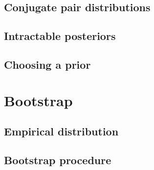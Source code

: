 \documentclass[../Year1.tex]{subfiles}
\begin{document}
\subsection{Conjugate pair distributions}
\subsection{Intractable posteriors}
\subsection{Choosing a prior}
\section{Bootstrap}
\subsection{Empirical distribution}
\subsection{Bootstrap procedure}
\end{document}
